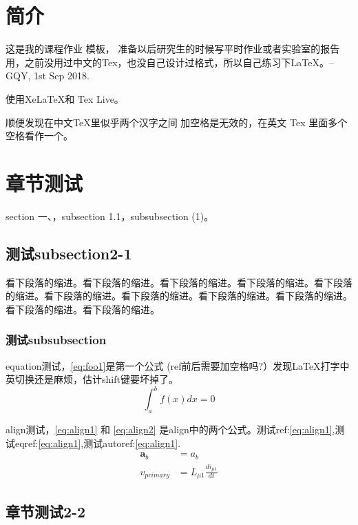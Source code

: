 \documentclass{myreport}
\begin{document}
\thispagestyle{empty}
\makemycover %




\clearpage
\newpage

\section{简介}
这是我的课程作业   模板，    准备以后研究生的时候写平时作业或者实验室的报告用，之前没用过中文的Tex，也没自己设计过格式，所以自己练习下\LaTeX。--GQY, 1st Sep 2018. 

使用XeLaTeX和 Tex Live。

顺便发现在中文TeX里似乎两个汉字之间   加空格是无效的，在英文 Tex 里面多个空格看作一个。


\section{章节测试}
section 一、，subsection 1.1，subsubsection (1)。
\subsection{测试subsection2-1}
看下段落的缩进。看下段落的缩进。看下段落的缩进。看下段落的缩进。看下段落的缩进。看下段落的缩进。看下段落的缩进。看下段落的缩进。看下段落的缩进。看下段落的缩进。看下段落的缩进。
\subsubsection{测试subsubsection}
equation测试，\eqref{eq:foo1}是第一个公式
{\color{red}(ref前后需要加空格吗?）}发现\LaTeX 打字中英切换还是麻烦，估计shift键要坏掉了。
\begin{equation}
\int_a^b f(x)dx = 0 \label{eq:foo1}
\end{equation}

align测试，\eqref{eq:align1} 和 \eqref{eq:align2} 是align中的两个公式。测试ref:\ref{eq:align1},测试eqref:\eqref{eq:align1},测试autoref:\autoref{eq:align1}.
\begin{align}
 \bm{a}_b &= a_b \label{eq:align1}\\
 v_{primary} &= L_{\mu 1}\frac{di_{\mu 1}}{dt} \label{eq:align2} 
\end{align}


\subsection{章节测试2-2}
\end{document}
